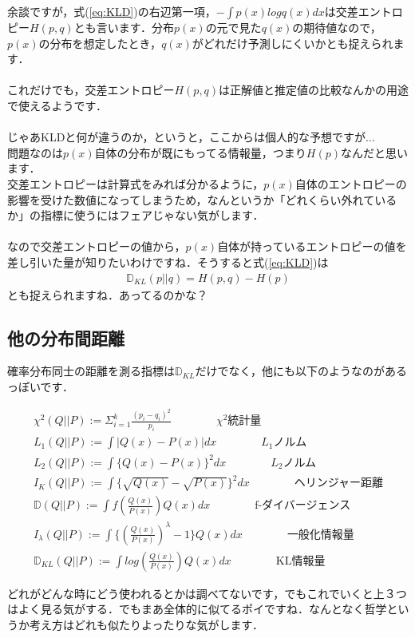\documentclass[11pt,a4paper,uplatex]{ujreport}
\begin{document}
余談ですが，式(\ref{eq:KLD})の右辺第一項，$- \int p(x) log q(x)dx$は交差エントロピー$H(p,q)$とも言います．分布$p(x)$の元で見た$q(x)$の期待値なので，$p(x)$の分布を想定したとき，$q(x)$がどれだけ予測しにくいかとも捉えられます．\\
\\
これだけでも，交差エントロピー$H(p,q)$は正解値と推定値の比較なんかの用途で使えるようです．\\
\\
じゃあKLDと何が違うのか，というと，ここからは個人的な予想ですが...\\
問題なのは$p(x)$自体の分布が既にもってる情報量，つまり$H(p)$なんだと思います．\\
交差エントロピーは計算式をみれば分かるように，$p(x)$自体のエントロピーの影響を受けた数値になってしまうため，なんというか「どれくらい外れているか」の指標に使うにはフェアじゃない気がします．\\
\\
なので交差エントロピーの値から，$p(x)$自体が持っているエントロピーの値を差し引いた量が知りたいわけですね．そうすると式(\ref{eq:KLD})は
\begin{eqnarray}
\mathbb{D}_{KL}(p||q) = H(p,q) - H(p)
\end{eqnarray}
とも捉えられますね．あってるのかな？

\subsection{他の分布間距離}
確率分布同士の距離を測る指標は$\mathbb{D}_{KL}$だけでなく，他にも以下のようなのがあるっぽいです\cite{dist}．
\begin{screen}
\begin{eqnarray}
\chi^2(Q||P) := \Sigma_{i=1}^k \frac{(p_i - q_i)^2}{p_i} \qquad \qquad  \text{$\chi^2$統計量}\\
L_1(Q||P) := \int |Q(x) - P(x)|dx   \qquad \qquad  \text{$L_1$ノルム} \\
L_2(Q||P) := \int\{ Q(x) - P(x)\}^2 dx   \qquad \qquad  \text{$L_2$ノルム}\\
I_K(Q||P) := \int \{ \sqrt{Q(x)} - \sqrt{P(x)} \}^2 dx    \qquad \qquad  \text{ヘリンジャー距離}\\
\mathbb{D}(Q||P) := \int f(\frac{Q(x)}{P(x)}) Q(x)dx   \qquad \qquad  \text{f-ダイバージェンス}\\
I_\lambda(Q||P) := \int \{ (\frac{Q(x)}{P(x)})^{\lambda} -1 \}Q(x) dx   \qquad \qquad  \text{一般化情報量}\\
\mathbb{D}_{KL}(Q||P) := \int log(\frac{Q(x)}{P(x)})Q(x) dx   \qquad \qquad  \text{KL情報量}
\end{eqnarray}
\end{screen}
どれがどんな時にどう使われるとかは調べてないです，でもこれでいくと上３つはよく見る気がする．でもまあ全体的に似てるポイですね．なんとなく哲学というか考え方はどれも似たりよったりな気がします．
\end{document}
